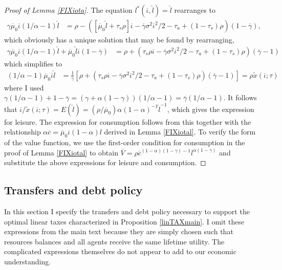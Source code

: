 \documentclass[11pt]{article}
\theoremstyle{plain}
\begin{document}
\begin{proof}[Proof of Lemma \ref{FIXiota}]
The equation $l^*(\overline{\iota}, \hat{l}) = \hat{l}$ rearranges to 
\begin{align*}
\gamma\overline{\mu}_0\overline{\iota}(1/\alpha-1)\hat{l} & = \rho - {\left([\overline{\mu}_0\hat{l} + \tau_s\rho]\overline{\iota} - \overline{\gamma}\sigma^2\overline{\iota}^2/2 - \tau_a + (1-\tau_s)\rho\right)}(1 - \overline{\gamma}),
\end{align*}
which obviously has a unique solution that may be found by rearranging,
\begin{align*}
\gamma\overline{\mu}_0\overline{\iota}(1/\alpha-1)\hat{l} + \overline{\mu}_0\hat{l}\overline{\iota}(1 - \overline{\gamma}) & = \rho + {\left( \tau_s\rho\overline{\iota} - \overline{\gamma}\sigma^2\overline{\iota}^2/2 - \tau_a + (1-\tau_s)\rho\right)}( \overline{\gamma}-1)
\end{align*}
which simplifies to
\begin{align*}
(1/\alpha-1)\overline{\mu}_0\overline{\iota}\hat{l} & = \frac{1}{\overline{\gamma}}{\left[\rho + {\left( \tau_s\rho\overline{\iota} - \overline{\gamma}\sigma^2\overline{\iota}^2/2 - \tau_a + (1-\tau_s)\rho\right)}( \overline{\gamma}-1)\right]} = \rho \tilde{x}(\overline{\iota};\tau)
\end{align*}
where I used $\gamma(1/\alpha-1) + 1 - \overline{\gamma} = {\left(\gamma + \alpha(1 - \gamma)\right)}(1/\alpha - 1) = \overline{\gamma}(1/\alpha - 1)$. It follows that $\overline{\iota}/\tilde{x}(\overline{\iota};\tau) = E(\hat{l}) = (\rho/\overline{\mu}_0) \alpha(1-\alpha)^{-1}\hat{l}^{-1}$, which gives the expression for leisure. The expression for consumption follows from this together with the relationship $\alpha \overline{c} = \overline{\mu}_0\overline{\iota}(1 - \alpha)l$ derived in Lemma \ref{FIXiotal}. To verify the form of the value function, we use the first-order condition for consumption in the proof of Lemma \ref{FIXiotal} to obtain $\overline{V} = \rho\overline{c}^{(1-\alpha)(1-\gamma)-1}l^{\alpha(1-\gamma)}$ and substitute the above expressions for leisure and consumption. 
\end{proof}



\subsection{Transfers and debt policy} \label{debt_pol}

In this section I specify the transfers and debt policy necessary to support the optimal linear taxes characterized in Proposition \ref{linTAXmain}. I omit these expressions from the main text because they are simply chosen such that resources balances and all agents receive the same lifetime utility. The complicated expressions themselves do not appear to add to our economic understanding. 
\end{document}
